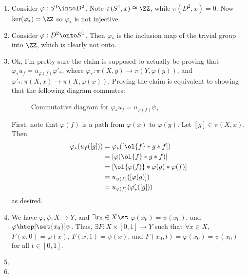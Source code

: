 \documentclass{fkbook}
\theoremstyle{snazzydefinition}
\begin{document}
\begin{adjustwidth}{1em}{}
\begin{enumerate}
    \item Consider $\varphi : S^1 \into D^2$. Note $\pi(S^1, x) \cong
      \ZZ$, while $\pi(D^2,x) = 0$. Now $\ker(\varphi_*) = \ZZ$ so
      $\varphi_*$ is not injective.
    \item Consider $\varphi : D^2 \onto S^1$. Then $\varphi_*$ is the
      inclusion map of the trivial group into $\ZZ$, which is clearly
      not onto.
    \item Ok, I'm pretty sure the claim is supposed to actually be
      proving that $\varphi_* u_f = u_{\varphi(f)} \varphi'_*$, where
      $\varphi_* : \pi(X,y) \to \pi(Y,\varphi(y))$, and $\varphi'_* :
      \pi(X,x) \to \pi(X,\varphi(x))$. Proving the claim is
      equivalent to showing that the following diagram commutes:
      \begin{figure}[H]
        \centering
        \caption{Commutative diagram for $\varphi_* u_f =
          u_{\varphi(f)} \psi_*$}
      \end{figure}
      First, note that $\varphi(f)$ is a path from $\varphi(x)$ to
      $\varphi(y)$. Let $[g] \in \pi(X,x)$. Then
      \begin{align*}
        \varphi_* (u_f([g]))
        &= \varphi_* ([\ol{f} * g * f]) \\
        &= [\varphi(\ol{f} * g * f)] \\
        &= [\ol{\varphi(f)} * \varphi(g) *\varphi(f)] \\
        &= u_{\varphi(f)}([\varphi(g)]) \\
        &= u_{\varphi(f)}(\varphi'_*([g]))
      \end{align*}
      as desired.
    \item We have $\varphi, \psi : X \to Y$, and $\exists x_0 \in X
      \st$ $\varphi(x_0) = \psi(x_0)$, and $\varphi \htop[\set{x_0}]
      \psi$. Thus, $\exists F : X \times [0,1] \to Y$ such that
      $\forall x \in X$, $F(x,0) = \varphi(x)$, $F(x,1) = \psi(x)$,
      and $F(x_0, t) = \varphi(x_0) = \psi(x_0)$ for all $t \in
      [0,1]$.
    \item
    \item
  \end{enumerate}

\end{adjustwidth}
\end{document}
